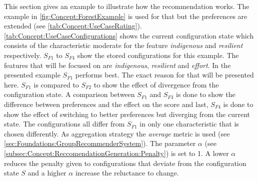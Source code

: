 This section gives an example to illustrate how the recommendation works. The example in \autoref{fig:Concept:ForestExample} is used for that but the preferences are extended (see \autoref{tab:Concept:UseCaseRating}). \autoref{tab:Concept:UseCaseConfigurations} shows the current configuration state which consists of the characteristic moderate for the feature \textit{indigenous} and  \textit{resilient} respectively. $S_{F1}$ to $S_{F4}$ show the stored configurations for this example. The features that will be focused on are \textit{indigenous}, \textit{resilient} and \textit{effort}. In the presented example $S_{F1}$ performs best. The exact reason for that will be presented here. $S_{F1}$ is compared to $S_{F2}$ to show the effect of divergence from the configuration state.  A comparison between $S_{F1}$  and $S_{F3}$ is done to show the difference between preferences and the effect on the score and last, $S_{F4}$ is done to show the effect of switching to better preferences but diverging from the current state. The configurations all differ from $S_{F1}$ in only one characteristic that is chosen differently. As aggregation strategy the \emph{average} metric is used (see \autoref{sec:Foundations:GroupRecommenderSystem}). The parameter $\alpha$ (see \autoref{subsec:Concept:ReccomendationGeneration:Penalty}) is set to 1. A lower $\alpha$ reduces the penalty given to configurations that deviate from the configuration state $S$ and a higher $\alpha$ increase the reluctance to change.

